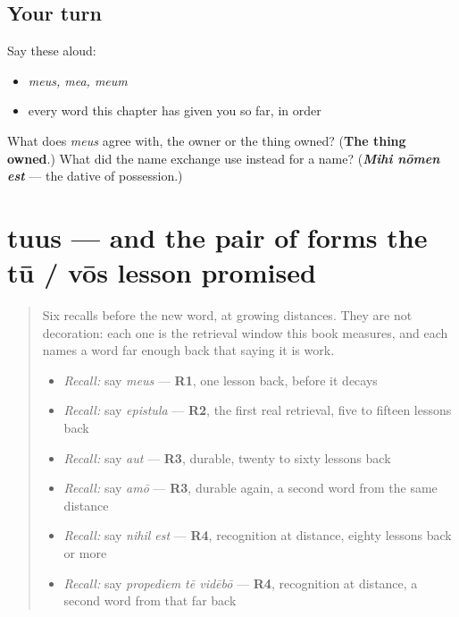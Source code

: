 \subsection*{Your turn}
Say these aloud:

\begin{itemize}
\raggedright
  \item \emph{meus, mea, meum}
  \item every word this chapter has given you so far, in order
\end{itemize}

\begin{tcolorbox}[breakable,colback=teal!4,colframe=teal!35!black,title={Before you move on}]
What does \emph{meus} agree with, the owner or the thing owned? (\textbf{The thing owned}.) What did the name exchange use instead for a name? (\emph{\textbf{Mihi nōmen est}} — the dative of possession.)
\end{tcolorbox}
\section[tuus, tua, tuum]{tuus — and the pair of forms the tū / vōs lesson promised}

\label{lesson:LA-C52-tuus}



\begin{quote}
Six recalls before the new word, at growing distances. They are not decoration: each one is the retrieval window this book measures, and each names a word far enough back that saying it is work.

\begin{itemize}
\raggedright
  \item \emph{Recall:} say \emph{meus} — \textbf{R1}, one lesson back, before it decays
  \item \emph{Recall:} say \emph{epistula} — \textbf{R2}, the first real retrieval, five to fifteen lessons back
  \item \emph{Recall:} say \emph{aut} — \textbf{R3}, durable, twenty to sixty lessons back
  \item \emph{Recall:} say \emph{amō} — \textbf{R3}, durable again, a second word from the same distance
  \item \emph{Recall:} say \emph{nihil est} — \textbf{R4}, recognition at distance, eighty lessons back or more
  \item \emph{Recall:} say \emph{propediem tē vidēbō} — \textbf{R4}, recognition at distance, a second word from that far back
\end{itemize}
\end{quote}

